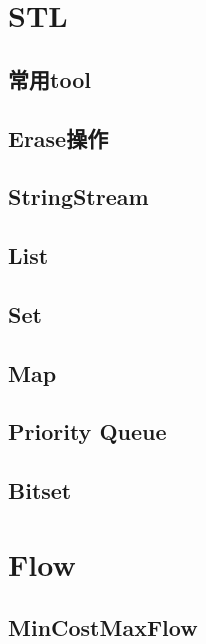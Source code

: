 \clearpage

\section{STL}

\subsection{常用tool}


\subsection{Erase操作}


\subsection{StringStream}


\subsection{List}


\subsection{Set}


\subsection{Map}


\subsection{Priority Queue}


\subsection{Bitset}


\section{Flow}

\subsection{MinCostMaxFlow}


